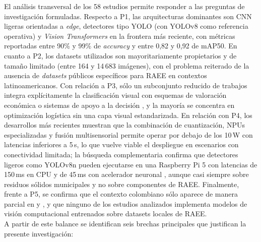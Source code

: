 El análisis transversal de los 58 estudios permite responder a las preguntas de investigación formuladas. Respecto a P1, las arquitecturas dominantes son CNN ligeras orientadas a \textit{edge}, detectores tipo YOLO (con YOLOv8 como referencia operativa) y \textit{Vision Transformers} en la frontera más reciente, con métricas reportadas entre 90\% y 99\% de \textit{accuracy} y entre 0{,}82 y 0{,}92 de mAP50. En cuanto a P2, los datasets utilizados son mayoritariamente propietarios y de tamaño limitado (entre 164 y 14\,683 imágenes), con el problema reiterado de la ausencia de \textit{datasets} públicos específicos para RAEE en contextos latinoamericanos. Con relación a P3, sólo un subconjunto reducido de trabajos integra explícitamente la clasificación visual con esquemas de valoración económica o sistemas de apoyo a la decisión \cite{joshiSustainableEWasteManagement2024,obayemiAutomatedWEEESortation2025a,stephenSmartAIIoTBlockchain2026,p.sLowPowerEdgeAI2026}, y la mayoría se concentra en optimización logística sin una capa visual estandarizada. En relación con P4, los desarrollos más recientes muestran que la combinación de cuantización, NPUs especializadas y fusión multisensorial permite operar por debajo de los 10\,W con latencias inferiores a 5\,s, lo que vuelve viable el despliegue en escenarios con conectividad limitada; la búsqueda complementaria confirma que detectores ligeros como YOLOv8n pueden ejecutarse en una Raspberry Pi 5 con latencias de 150\,ms en CPU y de 45\,ms con acelerador neuronal \cite{daoDesignImplementationRealTime2026,mutarAIBasedModelHome2026}, aunque casi siempre sobre residuos sólidos municipales y no sobre componentes de RAEE. Finalmente, frente a P5, se confirma que el contexto colombiano sólo aparece de manera parcial en \cite{a.ceronRecyclableWasteClassification2025a} y \cite{jesiddiazbastosImpactoResiduosAparatos2025}, y que ninguno de los estudios analizados implementa modelos de visión computacional entrenados sobre datasets locales de RAEE.\\

A partir de este balance se identifican seis brechas principales que justifican la presente investigación:

